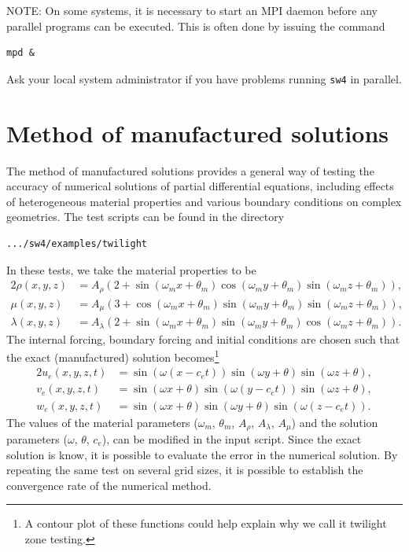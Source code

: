 \documentclass[11pt]{report}
\begin{document}
NOTE: On some systems, it is necessary to start an MPI daemon before any parallel programs can be
executed. This is often done by issuing the command
\begin{verbatim}
mpd &
\end{verbatim}
Ask your local system administrator if you have problems running \verb+sw4+ in parallel.

\section{Method of manufactured solutions}\label{sec:twilight}

The method of manufactured solutions provides a general way of testing the accuracy of numerical
solutions of partial differential equations, including effects of heterogeneous material properties
and various boundary conditions on complex geometries. The test scripts can be found in the
directory
\begin{verbatim}
.../sw4/examples/twilight
\end{verbatim}
In these tests, we take the material properties to be
\begin{alignat*}{2}
\rho(x,y,z) &= A_\rho \left( 2 + \sin(\omega_m x + \theta_m) \cos(\omega_m y + \theta_m)
\sin(\omega_m z + \theta_m) \right),\\ 
\mu(x,y,z) &=  A_\mu \left( 3 + \cos(\omega_m x + \theta_m) \sin(\omega_m y + \theta_m)
\sin(\omega_m z + \theta_m) \right),\\ 
\lambda(x,y,z) &=  A_\lambda \left( 2 + \sin(\omega_m x + \theta_m) \sin(\omega_m y + \theta_m)
\cos(\omega_m z + \theta_m) \right).
\end{alignat*}
The internal forcing, boundary forcing and initial conditions are chosen such that the exact
(manufactured) solution becomes\footnote{A contour plot of these functions could help explain why we
  call it twilight zone testing.}
\begin{alignat*}{2}
u_e(x,y,z,t) &= \sin(\omega(x-c_e t)) \sin(\omega y + \theta) \sin(\omega z + \theta), \\
v_e(x,y,z,t) &= \sin(\omega x + \theta) \sin(\omega( y - c_e t)) \sin(\omega z + \theta), \\
w_e(x,y,z,t) &= \sin(\omega x + \theta) \sin(\omega y + \theta) \sin(\omega( z - c_e t)). 
\end{alignat*}
The values of the material parameters ($\omega_m$, $\theta_m$, $A_\rho$, $A_\lambda$, $A_\mu$) and
the solution parameters ($\omega$, $\theta$, $c_e$), can be modified in the input script. Since the
exact solution is know, it is possible to evaluate the error in the numerical solution. By repeating
the same test on several grid sizes, it is possible to establish the convergence rate of the
numerical method.
\end{document}
